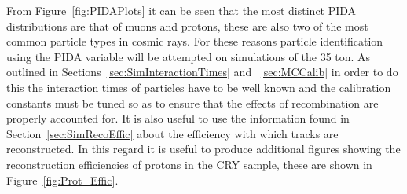 From Figure~\ref{fig:PIDAPlots} it can be seen that the most distinct PIDA distributions are that of muons and protons, these are also two of the most common particle types in cosmic rays. For these reasons particle identification using the PIDA variable will be attempted on simulations of the 35 ton. As outlined in Sections~\ref{sec:SimInteractionTimes} and ~\ref{sec:MCCalib} in order to do this the interaction times of particles have to be well known and the calibration constants must be tuned so as to ensure that the effects of recombination are properly accounted for. It is also useful to use the information found in Section~\ref{sec:SimRecoEffic} about the efficiency with which tracks are reconstructed. In this regard it is useful to produce additional figures showing the reconstruction efficiencies of protons in the CRY sample, these are shown in Figure~\ref{fig:Prot_Effic}.\\

